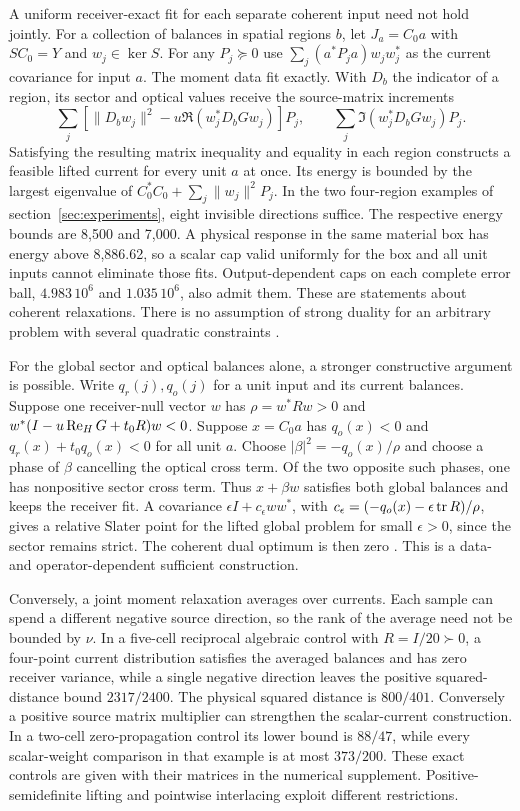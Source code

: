 A uniform receiver-exact fit for each separate coherent input need not hold jointly. For a collection of balances in spatial regions $b$, let $J_a=C_0a$ with $SC_0=Y$ and $w_j\in\ker S$. For any $P_j\succeq0$ use $\sum_j(a^*P_ja)w_jw_j^*$ as the current covariance for input $a$. The moment data fit exactly. With $D_b$ the indicator of a region, its sector and optical values receive the source-matrix increments
\[
 \sum_j[\|D_bw_j\|^2-u\Re(w_j^*D_bGw_j)]P_j,\qquad
 \sum_j\Im(w_j^*D_bGw_j)P_j .
\]
Satisfying the resulting matrix inequality and equality in each region constructs a feasible lifted current for every unit $a$ at once. Its energy is bounded by the largest eigenvalue of $C_0^*C_0+\sum_j\|w_j\|^2P_j$. In the two four-region examples of section~\ref{sec:experiments}, eight invisible directions suffice. The respective energy bounds are 8,500 and 7,000. A physical response in the same material box has energy above 8,886.62, so a scalar cap valid uniformly for the box and all unit inputs cannot eliminate those fits. Output-dependent caps on each complete error ball, $4.983\,10^6$ and $1.035\,10^6$, also admit them. These are statements about coherent relaxations. There is no assumption of strong duality for an arbitrary problem with several quadratic constraints \cite{beck}.

For the global sector and optical balances alone, a stronger constructive argument is possible. Write $q_r(j),q_o(j)$ for a unit input and its current balances. Suppose one receiver-null vector $w$ has $\rho=w^*Rw>0$ and $w^*(I-u\operatorname{Re}_{H} G+t_0R)w<0$. Suppose $x=C_0a$ has $q_o(x)<0$ and $q_r(x)+t_0q_o(x)<0$ for all unit $a$. Choose $|\beta|^2=-q_o(x)/\rho$ and choose a phase of $\beta$ cancelling the optical cross term. Of the two opposite such phases, one has nonpositive sector cross term. Thus $x+\beta w$ satisfies both global balances and keeps the receiver fit. A covariance $\epsilon I+c_\epsilon ww^*$, with $c_\epsilon=(-q_o(x)-\epsilon\operatorname{tr} R)/\rho$, gives a relative Slater point for the lifted global problem for small $\epsilon>0$, since the sector remains strict. The coherent dual optimum is then zero \cite{boyd}. This is a data- and operator-dependent sufficient construction.

Conversely, a joint moment relaxation averages over currents. Each sample can spend a different negative source direction, so the rank of the average need not be bounded by $\nu$. In a five-cell reciprocal algebraic control with $R=I/20\succ0$, a four-point current distribution satisfies the averaged balances and has zero receiver variance, while a single negative direction leaves the positive squared-distance bound $2317/2400$. The physical squared distance is $800/401$. Conversely a positive source matrix multiplier can strengthen the scalar-current construction. In a two-cell zero-propagation control its lower bound is $88/47$, while every scalar-weight comparison in that example is at most $373/200$. These exact controls are given with their matrices in the numerical supplement. Positive-semidefinite lifting and pointwise interlacing exploit different restrictions.


